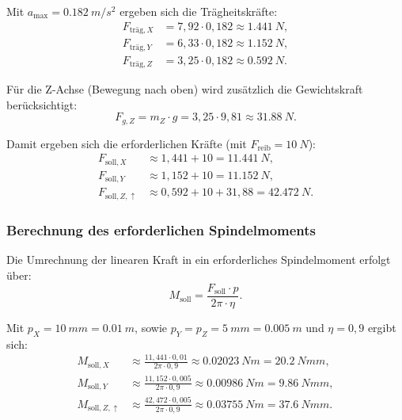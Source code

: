 Mit $a_{\max}=\SI{0,182}{m/s^2}$ ergeben sich die Trägheitskräfte:
\begin{align}
F_{\text{träg},X}&=7,92\cdot 0,182 \approx \SI{1,441}{N},\\
F_{\text{träg},Y}&=6,33\cdot 0,182 \approx \SI{1,152}{N},\\
F_{\text{träg},Z}&=3,25\cdot 0,182 \approx \SI{0,592}{N}.
\end{align}

Für die Z-Achse (Bewegung nach oben) wird zusätzlich die Gewichtskraft berücksichtigt:
\begin{equation}
F_{g,Z}=m_Z\cdot g=3,25\cdot 9,81 \approx \SI{31,88}{N}.
\end{equation}

Damit ergeben sich die erforderlichen Kräfte (mit $F_{\text{reib}}=\SI{10}{N}$):
\begin{align}
F_{\text{soll},X} &\approx 1,441 + 10 = \SI{11,441}{N},\\
F_{\text{soll},Y} &\approx 1,152 + 10 = \SI{11,152}{N},\\
F_{\text{soll},Z,\uparrow} &\approx 0,592 + 10 + 31,88 = \SI{42,472}{N}.
\end{align}

\subsubsection{Berechnung des erforderlichen Spindelmoments}

Die Umrechnung der linearen Kraft in ein erforderliches Spindelmoment erfolgt über:
\begin{equation}
M_\text{soll}=\frac{F_\text{soll}\cdot p}{2\pi \cdot \eta}.
\end{equation}

Mit $p_X=\SI{10}{mm}=\SI{0,01}{m}$, sowie $p_{Y}=p_{Z}=\SI{5}{mm}=\SI{0,005}{m}$ und $\eta=0,9$ ergibt sich:
\begin{align}
M_{\text{soll},X} &\approx \frac{11,441\cdot 0,01}{2\pi\cdot 0,9} \approx \SI{0,02023}{Nm}=\SI{20,2}{Nmm},\\
M_{\text{soll},Y} &\approx \frac{11,152\cdot 0,005}{2\pi\cdot 0,9} \approx \SI{0,00986}{Nm}=\SI{9,86}{Nmm},\\
M_{\text{soll},Z,\uparrow} &\approx \frac{42,472\cdot 0,005}{2\pi\cdot 0,9} \approx \SI{0,03755}{Nm}=\SI{37,6}{Nmm}.
\end{align}

